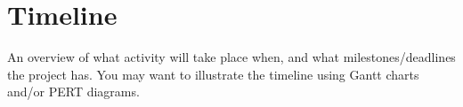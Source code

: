 \section{Timeline}


An overview of what activity will take place when, and what milestones/deadlines the project has.
You may want to illustrate the timeline using Gantt charts and/or PERT diagrams.
